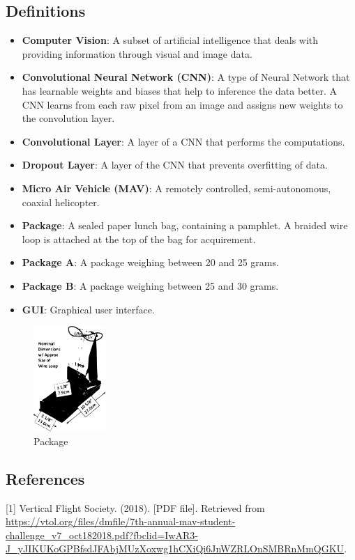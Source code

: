 \documentclass[onecolumn, oneside, letterpaper, draftclsnofoot, 10pt, compsoc]{IEEEtran}
\begin{document}
\subsection{Definitions}
\begin{itemize}
    \item \textbf{Computer Vision}: A subset of artificial intelligence that deals with providing information through visual and image data.
    \item \textbf{Convolutional Neural Network (CNN)}: A type of Neural Network that has learnable weights and biases that help to inference the data better. A CNN learns from each raw pixel from an image and assigns new weights to the convolution layer.
    \item \textbf{Convolutional Layer}: A layer of a CNN that performs the computations.
    \item \textbf{Dropout Layer}: A layer of the CNN that prevents overfitting of data.
    \item \textbf{Micro Air Vehicle (MAV)}: A remotely controlled, semi-autonomous, coaxial helicopter.
    \item \textbf{Package}: A sealed paper lunch bag, containing a pamphlet. A braided wire loop is attached at the top of the bag for acquirement.
    \item \textbf{Package A}: A package weighing between 20 and 25 grams.
    \item \textbf{Package B}: A package weighing between 25 and 30 grams.
    \item \textbf{GUI}: Graphical user interface.
\end{itemize}
\begin{figure}[h!]
\centering
\includegraphics[height=4cm]{graphics/bag.eps}
\caption{Package}
\end{figure}

\subsection{References}
[1]
\newblock Vertical Flight Society. (2018).
 [PDF file].
\newblock Retrieved from \url{ https://vtol.org/files/dmfile/7th-annual-mav-student-challenge_v7_oct182018.pdf?fbclid=IwAR3-J_yJIKUKoGPBfsdJFAbjMUzXoxwg1hCXiQi6JnWZRLOnSMBRnMmQGKU}.
\end{document}
